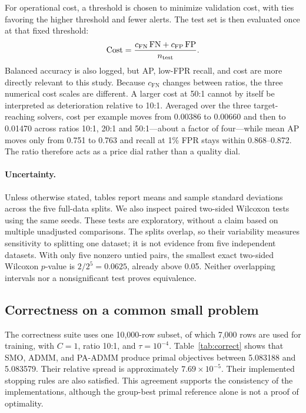 \documentclass{article}
\newcommand{\FN}{\mathrm{FN}}
\newcommand{\FP}{\mathrm{FP}}
\newcommand{\FNcost}{c_{\mathrm{FN}}}
\newcommand{\FPcost}{c_{\mathrm{FP}}}
\begin{document}
For operational cost, a threshold is chosen to minimize validation cost, with ties favoring the higher threshold and fewer alerts. The test set is then evaluated once at that fixed threshold:
\begin{equation}
 \operatorname{Cost}=\frac{\FNcost\,\FN+\FPcost\,\FP}{n_{\rm test}}.
 \label{eq:cost}
\end{equation}
Balanced accuracy is also logged, but AP, low-FPR recall, and cost are more directly relevant to this study. Because $\FNcost$ changes between ratios, the three numerical cost scales are different. A larger cost at 50:1 cannot by itself
be interpreted as deterioration relative to 10:1. Averaged over the three target-reaching solvers, cost per example moves from 0.00386 to
0.00660 and then to 0.01470 across ratios 10:1, 20:1 and 50:1---about a factor of four---while mean AP moves only from 0.751 to 0.763 and
recall at 1\% FPR stays within 0.868--0.872. The ratio therefore acts as a price dial rather than a quality dial.

\paragraph{Uncertainty.}
Unless otherwise stated, tables report means and sample standard deviations across the five full-data splits. We also inspect paired two-sided Wilcoxon tests using the same seeds. These tests are exploratory, without a claim based on multiple unadjusted comparisons. The splits overlap, so their variability measures sensitivity to splitting one dataset; it is not evidence from five independent datasets. With only five nonzero untied pairs, the smallest exact two-sided Wilcoxon $p$-value is $2/2^5=0.0625$, already above 0.05. Neither overlapping intervals nor a nonsignificant test proves equivalence.

\subsection{Correctness on a common small problem}

The correctness suite uses one 10,000-row subset, of which 7,000 rows are used for training, with $C=1$, ratio 10:1, and $\tau=10^{-4}$. Table~\ref{tab:correct} shows that SMO, ADMM, and PA-ADMM produce primal objectives between 5.083188 and 5.083579. Their relative spread is approximately $7.69\times10^{-5}$. Their implemented stopping rules are also satisfied. This agreement supports the consistency of the implementations, although the group-best primal reference alone is not a proof of optimality.
\end{document}
